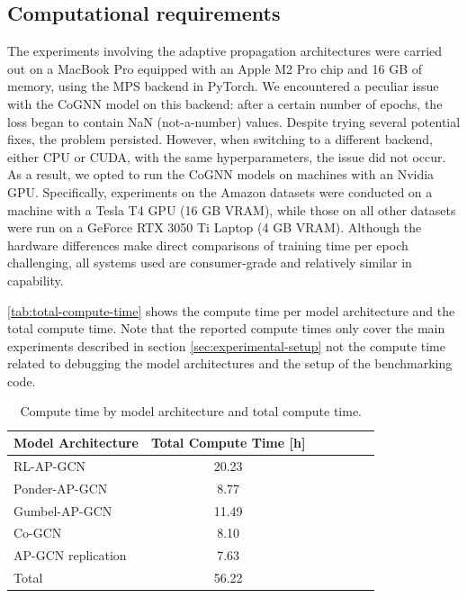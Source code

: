 \documentclass{gdl}
\begin{document}
\subsection{Computational requirements}
The experiments involving the adaptive propagation architectures were carried out on a MacBook Pro equipped with an Apple M2 Pro chip and 16 GB of memory, using the MPS backend in PyTorch. We encountered a peculiar issue with the CoGNN model on this backend: after a certain number of epochs, the loss began to contain NaN (not-a-number) values. Despite trying several potential fixes, the problem persisted. However, when switching to a different backend, either CPU or CUDA, with the same hyperparameters, the issue did not occur. As a result, we opted to run the CoGNN models on machines with an Nvidia GPU. Specifically, experiments on the Amazon datasets were conducted on a machine with a Tesla T4 GPU (16 GB VRAM), while those on all other datasets were run on a GeForce RTX 3050 Ti Laptop (4 GB VRAM). Although the hardware differences make direct comparisons of training time per epoch challenging, all systems used are consumer-grade and relatively similar in capability.

\autoref{tab:total-compute-time} shows the compute time per model architecture and the total compute time. Note that the reported compute times only cover the main experiments described in section \ref{sec:experimental-setup} not the compute time related to debugging the model architectures and the setup of the benchmarking code.

\begin{table}[h]
    \small\sf
    \setlength{\tabcolsep}{2pt}
    \caption{Compute time by model architecture and total compute time.}
    \begin{tabular}{l c c c c c c}
        \toprule
        Model Architecture & Total Compute Time [h]\\
        \midrule
        RL-AP-GCN & 20.23 \\
        Ponder-AP-GCN & 8.77 \\
        Gumbel-AP-GCN & 11.49 \\
        Co-GCN & 8.10   \\
        AP-GCN replication & 7.63  \\
        \midrule
        Total & 56.22 \\
        \bottomrule
    \end{tabular}
    \label{tab:total-compute-time}
\end{table}
\end{document}
